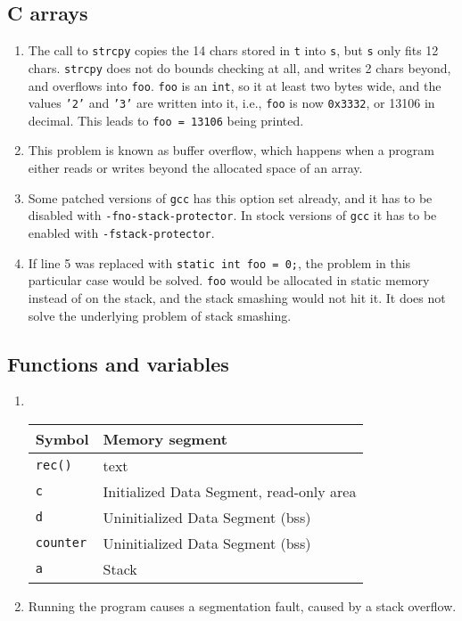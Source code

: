 \documentclass{article}
\begin{document}
\subsection*{C arrays}
\begin{enumerate}[label=\alph*.]
    \item The call to \texttt{strcpy} copies the 14 chars stored in \texttt{t} into \texttt{s}, but
        \texttt{s} only fits 12 chars. \texttt{strcpy} does not do bounds checking at all, and
        writes 2 chars beyond, and overflows into \texttt{foo}. \texttt{foo} is an \texttt{int},
        so it at least two bytes wide, and the values \texttt{'2'} and \texttt{'3'} are written into
        it, i.e., \texttt{foo} is now \texttt{0x3332}, or 13106 in decimal. This leads to
        \texttt{foo = 13106} being printed.

    \item This problem is known as buffer overflow, which happens when a program either reads or
        writes beyond the allocated space of an array.

    \item Some patched versions of \texttt{gcc} has this option set already, and it has to be disabled with
        \texttt{-fno-stack-protector}. In stock versions of \texttt{gcc} it has to be enabled with
        \texttt{-fstack-protector}.

    \item If line 5 was replaced with \texttt{static int foo = 0;}, the problem in this particular
        case would be solved. \texttt{foo} would be allocated in static memory instead of on the
        stack, and the stack smashing would not hit it. It does not solve the underlying problem of
        stack smashing.
\end{enumerate}

\newpage
\subsection*{Functions and variables}
\begin{enumerate}[label=\alph*.]
    \item \

        \begin{tabular}{ll}
            Symbol           & Memory segment \\ \hline
            \texttt{rec()}   & text\\
            \texttt{c}       & Initialized Data Segment, read-only area \\
            \texttt{d}       & Uninitialized Data Segment (bss) \\
            \texttt{counter} & Uninitialized Data Segment (bss) \\
            \texttt{a}       & Stack\\ \hline
        \end{tabular}
    \item
        Running the program causes a segmentation fault, caused by a stack overflow.
\end{enumerate}
\end{document}
